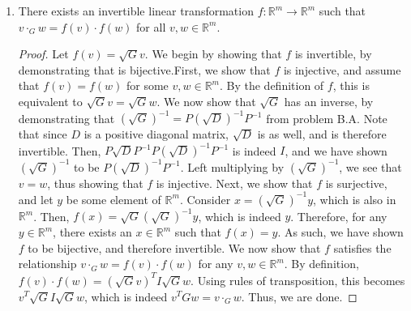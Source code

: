\documentclass[12pt]{article}
\begin{document}
\begin{enumerate}[label=\Alph*.]
\begin{enumerate}[label=\theenumi\Alph*]
        \item There exists an invertible linear transformation $f: \mathbb{R}^m\rightarrow \mathbb{R}^m$ such that $v\cdot_{G} w = f(v)\cdot f(w)$ for all $v,w \in \mathbb{R}^m$.
              \begin{proof}
                Let $f(v)=\sqrt{G}v$. We begin by showing that $f$ is invertible, by demonstrating that is bijective.\newline First, we show that $f$ is injective, and assume that $f(v)=f(w)$ for some $v,w \in {\mathbb{R}}^m$. By the definition of $f$, this is equivalent to $\sqrt{G}v=\sqrt{G}w$.
                We now show that $\sqrt{G}$ has an inverse, by demonstrating that $(\sqrt{G})^{-1}=P(\sqrt{D})^{-1}P^{-1}$ from problem B.A. Note that since $D$ is a positive diagonal matrix, $\sqrt{D}$ is as well, and is therefore invertible.
                Then, $P\sqrt{D}P^{-1}P(\sqrt{D})^{-1}P^{-1}$ is indeed $I$, and we have shown $(\sqrt{G})^{-1}$ to be $P(\sqrt{D})^{-1}P^{-1}$. Left multiplying by $(\sqrt{G})^{-1}$, we see that $v=w$, thus showing that $f$ is injective.\newline
                Next, we show that $f$ is surjective, and let $y$ be some element of $\mathbb{R}^m$. Consider $x=(\sqrt{G})^{-1}y$, which is also in $\mathbb{R}^m$.
                Then, $f(x)=\sqrt{G}(\sqrt{G})^{-1}y$, which is indeed $y$. Therefore, for any $y\in \mathbb{R}^m$, there exists an $x\in \mathbb{R}^m$ such that $f(x)=y$. As such, we have shown
                $f$ to be bijective, and therefore invertible.\newline
                We now show that $f$ satisfies the relationship $v\cdot_{G} w = f(v)\cdot f(w)$ for any $v,w \in \mathbb{R}^m$. By definition, $f(v)\cdot f(w)=(\sqrt{G}v)^{T}I\sqrt{G}w$. Using rules of transposition,
                this becomes $v^T\sqrt{G}I\sqrt{G}w$, which is indeed $v^TGw=v\cdot_{G} w$. Thus, we are done.
              \end{proof}
    \end{enumerate}
\end{enumerate}
\end{document}

